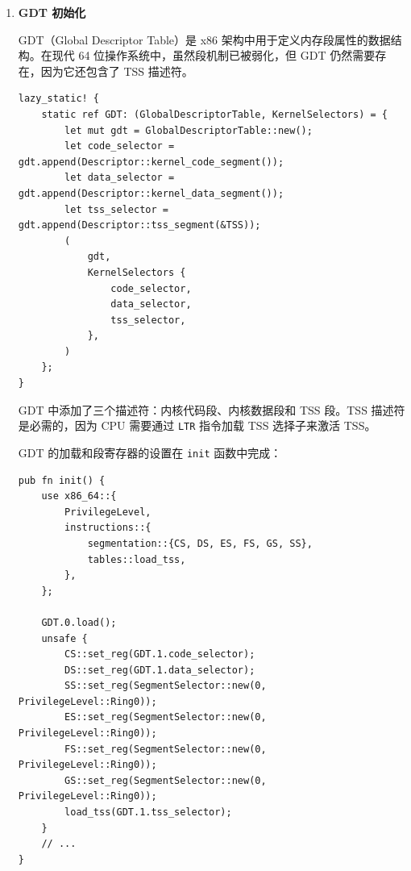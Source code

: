 \documentclass{SYSUReport}
\begin{document}
\begin{enumerate}[label={\chinese*、},labelsep=0pt]
\begin{verbatim}
        tss
    };
}
    \end{verbatim}

    这里需要注意几个关键点。首先，IST 栈使用静态缓冲区分配在 BSS 段，这是因为在内核启动早期，堆分配器尚未初始化，无法使用动态内存分配。其次，\texttt{tss.interrupt\_stack\_table} 存储的是栈顶地址而非栈底地址，这是因为 x86\_64 架构的栈是向下增长的，CPU 在切换栈时会直接使用这个值作为新的 RSP。

    使用 \texttt{addr\_of\_mut!} 宏获取静态变量的地址是 Rust 中处理可变静态变量的安全方式，它避免了直接引用可变静态变量可能导致的未定义行为。

    \item \textbf{GDT 初始化}

    GDT（Global Descriptor Table）是 x86 架构中用于定义内存段属性的数据结构。在现代 64 位操作系统中，虽然段机制已被弱化，但 GDT 仍然需要存在，因为它还包含了 TSS 描述符。

    \begin{verbatim}
lazy_static! {
    static ref GDT: (GlobalDescriptorTable, KernelSelectors) = {
        let mut gdt = GlobalDescriptorTable::new();
        let code_selector = gdt.append(Descriptor::kernel_code_segment());
        let data_selector = gdt.append(Descriptor::kernel_data_segment());
        let tss_selector = gdt.append(Descriptor::tss_segment(&TSS));
        (
            gdt,
            KernelSelectors {
                code_selector,
                data_selector,
                tss_selector,
            },
        )
    };
}
    \end{verbatim}

    GDT 中添加了三个描述符：内核代码段、内核数据段和 TSS 段。TSS 描述符是必需的，因为 CPU 需要通过 \texttt{LTR} 指令加载 TSS 选择子来激活 TSS。

    GDT 的加载和段寄存器的设置在 \texttt{init} 函数中完成：

    \begin{verbatim}
pub fn init() {
    use x86_64::{
        PrivilegeLevel,
        instructions::{
            segmentation::{CS, DS, ES, FS, GS, SS},
            tables::load_tss,
        },
    };

    GDT.0.load();
    unsafe {
        CS::set_reg(GDT.1.code_selector);
        DS::set_reg(GDT.1.data_selector);
        SS::set_reg(SegmentSelector::new(0, PrivilegeLevel::Ring0));
        ES::set_reg(SegmentSelector::new(0, PrivilegeLevel::Ring0));
        FS::set_reg(SegmentSelector::new(0, PrivilegeLevel::Ring0));
        GS::set_reg(SegmentSelector::new(0, PrivilegeLevel::Ring0));
        load_tss(GDT.1.tss_selector);
    }
    // ...
}
    \end{verbatim}


\end{enumerate}
\end{document}
